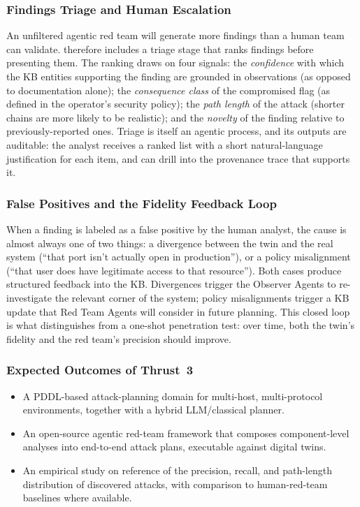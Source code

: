 \subsubsection{Findings Triage and Human Escalation}

An unfiltered agentic red team will generate more findings than a
human team can validate. \sysname therefore includes a triage stage
that ranks findings before presenting them. The ranking draws on four
signals: the \emph{confidence} with which the KB entities supporting
the finding are grounded in observations (as opposed to documentation
alone); the \emph{consequence class} of the compromised flag (as
defined in the operator's security policy); the \emph{path length} of
the attack (shorter chains are more likely to be realistic); and the
\emph{novelty} of the finding relative to previously-reported ones.
Triage is itself an agentic process, and its outputs are auditable:
the analyst receives a ranked list with a short natural-language
justification for each item, and can drill into the provenance trace
that supports it.

\subsubsection{False Positives and the Fidelity Feedback Loop}

When a finding is labeled as a false positive by the human analyst,
the cause is almost always one of two things: a divergence between
the twin and the real system (``that port isn't actually open in
production''), or a policy misalignment (``that user does have
legitimate access to that resource''). Both cases produce structured
feedback into the KB. Divergences trigger the Observer Agents to
re-investigate the relevant corner of the system; policy
misalignments trigger a KB update that Red Team Agents will consider
in future planning. This closed loop is what distinguishes \sysname
from a one-shot penetration test: over time, both the twin's fidelity
and the red team's precision should improve.

\subsubsection{Expected Outcomes of Thrust~3}
\begin{itemize}[leftmargin=1.3em,itemsep=0.1em,topsep=0.2em]
  \item A PDDL-based attack-planning domain for multi-host, multi-protocol
  \cps environments, together with a hybrid LLM/classical planner.
  \item An open-source agentic red-team framework that composes
  component-level analyses into end-to-end attack plans, executable
  against \sysname digital twins.
  \item An empirical study on reference \CPSs of the precision, recall,
  and path-length distribution of discovered attacks, with comparison
  to human-red-team baselines where available.
\end{itemize}
